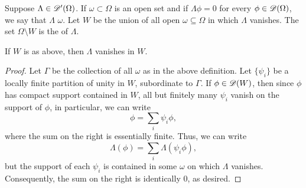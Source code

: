 \begin{definition}
    Suppose $\Lambda\in\mathscr{D}'(\Omega)$. If $\omega\subset\Omega$ is an open set and if $\Lambda\phi = 0$ for every $\phi\in\mathscr{D}(\Omega)$, we say that $\Lambda$  $\omega$. Let $W$ be the union of all open $\omega\subseteq\Omega$ in which $\Lambda$ vanishes. The set $\Omega\setminus W$ is the  of $\Lambda$.
\end{definition}

\begin{theorem}
    If $W$ is as above, then $\Lambda$ vanishes in $W$.
\end{theorem}
\begin{proof}
    Let $\Gamma$ be the collection of all $\omega$ as in the above definition. Let $\{\psi_i\}$ be a locally finite partition of unity in $W$, subordinate to $\Gamma$. If $\phi\in\mathscr{D}(W)$, then since $\phi$ has compact support contained in $W$, all but finitely many $\psi_i$ vanish on the support of $\phi$, in particular, we can write 
    \begin{equation*}
        \phi = \sum_{i}\psi_i\phi,
    \end{equation*}
    where the sum on the right is essentially finite. Thus, we can write 
    \begin{equation*}
        \Lambda(\phi) = \sum_i \Lambda(\psi_i\phi),
    \end{equation*}
    but the support of each $\psi_i$ is contained in some $\omega$ on which $\Lambda$ vanishes. Consequently, the sum on the right is identically $0$, as desired.
\end{proof}

